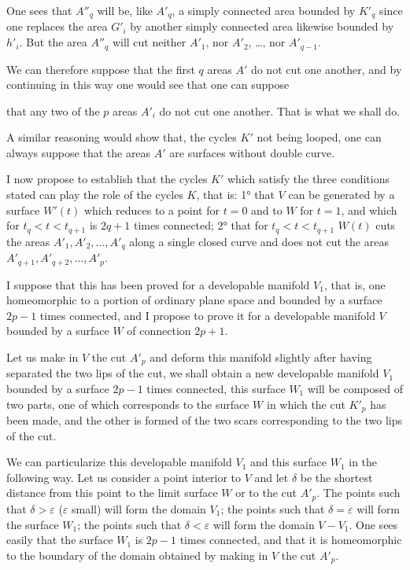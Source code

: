 \documentclass{article}
\begin{document}
One sees that $A''_{q}$ will be, like $A'_{q}$, a simply connected area bounded by $K'_{q}$ since one replaces the area $G'_{i}$ by another simply connected area likewise bounded by $h'_{i}$. But the area $A''_{q}$ will cut neither $A'_{1}$, nor $A'_{2}$, \ldots, nor $A'_{q-1}$.

We can therefore suppose that the first $q$ areas $A'$ do not cut one another, and by continuing in this way one would see that one can suppose

that any two of the $p$ areas $A'_{i}$ do not cut one another. That is what we shall do.

A similar reasoning would show that, the cycles $K'$ not being looped, one can always suppose that the areas $A'$ are surfaces without double curve.

I now propose to establish that the cycles $K'$ which satisfy the three conditions stated can play the role of the cycles $K$, that is: 1° that $V$ can be generated by a surface $W'(t)$ which reduces to a point for $t = 0$ and to $W$ for $t = 1$, and which for $t_{q} < t < t_{q+1}$ is $2q + 1$ times connected; 2° that for $t_{q} < t < t_{q+1}$ $W(t)$ cuts the areas $A'_{1}, A'_{2}, \ldots, A'_{q}$ along a single closed curve and does not cut the areas $A'_{q+1}, A'_{q+2}, \ldots, A'_{p}$.

I suppose that this has been proved for a developable manifold $V_{1}$, that is, one homeomorphic to a portion of ordinary plane space and bounded by a surface $2p - 1$ times connected, and I propose to prove it for a developable manifold $V$ bounded by a surface $W$ of connection $2p + 1$.

Let us make in $V$ the cut $A'_{p}$ and deform this manifold slightly after having separated the two lips of the cut, we shall obtain a new developable manifold $V_{1}$ bounded by a surface $2p - 1$ times connected, this surface $W_{1}$ will be composed of two parts, one of which corresponds to the surface $W$ in which the cut $K'_{p}$ has been made, and the other is formed of the two scars corresponding to the two lips of the cut.

We can particularize this developable manifold $V_{1}$ and this surface $W_{1}$ in the following way. Let us consider a point interior to $V$ and let $\delta$ be the shortest distance from this point to the limit surface $W$ or to the cut $A'_{p}$. The points such that $\delta > \varepsilon$ ($\varepsilon$ small) will form the domain $V_{1}$; the points such that $\delta = \varepsilon$ will form the surface $W_{1}$; the points such that $\delta < \varepsilon$ will form the domain $V - V_{1}$. One sees easily that the surface $W_{1}$ is $2p - 1$ times connected, and that it is homeomorphic to the boundary of the domain obtained by making in $V$ the cut $A'_{p}$.
\end{document}
